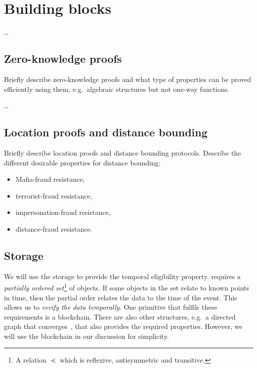 \section{Building blocks}%
\label{Primitives}\label{BuildingBlocks}

\dots

\subsection{Zero-knowledge proofs}

Briefly describe zero-knowledge proofs and what type of properties can be proved 
efficiently using them, e.g.\ algebraic structures but not one-way functions.

\dots



\subsection{Location proofs and distance bounding}

Briefly describe location proofs and distance bounding protocols.
Describe the different desirable properties for distance bounding:
\begin{itemize}
  \item Mafia-fraud resistance,
  \item terrorist-fraud resistance,
  \item impersonation-fraud resistance,
  \item distance-fraud resistance.
\end{itemize}

\subsection{Storage}%
\label{StorageProperties}

We will use the storage to provide the temporal eligibility property.
 requires a \emph{partially ordered 
  set}\footnote{%
  A relation \(\preceq\) which is reflexive, antisymmetric and transitive.
} of objects.
If some objects in the set relate to known points in time, then the partial 
order relates the data to the time of the event.
This allows us to \emph{verify the data temporally}.
One primitive that fulfils these requirements is a blockchain.
There are also other structures, e.g.\ a directed graph that 
converges~\cite{BlockchainFreeCryptocurrencies}, that also provides the required 
properties.
However, we will use the blockchain in our discussion for simplicity.

